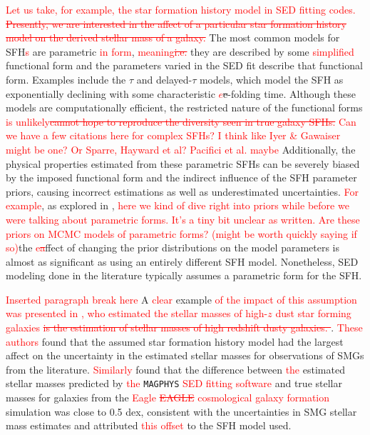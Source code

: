 \documentclass[twocolumn]{aastex62}
\newcommand{\red}[1]{{\textcolor{red}{#1}}}
\begin{document}
\red{Let us take, for example, the star formation history model in SED fitting codes.\sout{
Presently, we are interested in the affect of a particular star formation history model on the derived stellar mass of a galaxy.}} The most common models for SFH\red{s} are parametric \red{in form}, \red{meaning\sout{i.e.}} they are described by some \red{simplified} functional form and the parameters varied in the SED fit describe that functional form. Examples include the $\tau$ and delayed-$\tau$ models, which model the SFH as exponentially declining with some characteristic \red{$e$}\sout{e}-folding time. Although these models are computationally efficient, the restricted nature of the functional forms \red{is unlikely\sout{cannot hope to reproduce the diversity seen in true galaxy SFHs.}} \red{Can we have a few citations here for complex SFHs?  I think like Iyer \& Gawaiser might be one?  Or Sparre, Hayward et al? Pacifici et al. maybe} Additionally, the physical properties estimated from these parametric SFHs can be severely biased by the imposed functional form and the indirect influence of the SFH parameter priors, causing incorrect estimations as well as underestimated uncertainties. \red{For example}, as explored in \cite{carnall_how_2018}, \red{here we kind of dive right into priors while before we were talking about parametric forms.  It's a tiny bit unclear as written. Are these priors on MCMC models of parametric forms?  (might be worth quickly saying if so)}the \red{e\sout{a}}ffect of changing the prior distributions on the model parameters is almost as significant as using an entirely different SFH model. Nonetheless, SED modeling done in the literature typically assumes a parametric form for the SFH. 

\red{Inserted paragraph break here} A \red{clear} example \red{of the impact of this assumption was presented in \citet{michalowski_stellar_2012}, who estimated the stellar masses of high-$z$ dust star forming galaxies \sout{is the estimation of stellar masses of high redshift dusty galaxies. \cite{michalowski_stellar_2012}}}.  \red{These authors} found that the assumed star formation history model had the largest affect on the uncertainty in the estimated stellar masses for observations of SMGs from the literature. \red{Similarly} \cite{dudzeviciute_alma_2019} found that the difference between \red{the} estimated stellar masses predicted by \red{the} \texttt{MAGPHYS} 
\red{SED fitting software} and true stellar masses for galaxies from the \red{\sc Eagle \sout{EAGLE}} \red{cosmological galaxy formation} simulation was close to 0.5 dex, consistent with the uncertainties in \citet{michalowski_stellar_2012} SMG stellar mass estimates and attributed \red{this offset} to the SFH model used. 
\end{document}
